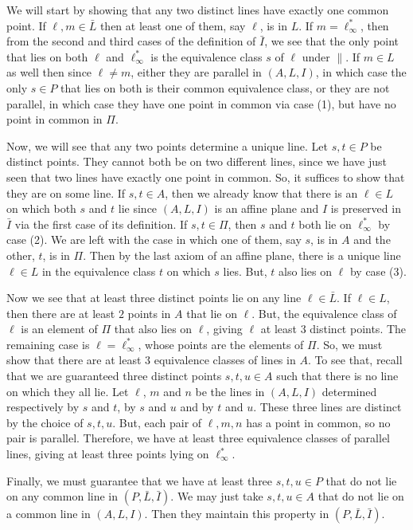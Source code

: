 \documentclass[../../main]{subfiles}
\begin{document}
We will start by showing that any two distinct lines have exactly one common
point. If $\ell,m\in\bar L$ then at least one of them, say $\ell$, is in $L$. If
$m=\ell^*_\infty$, then from the second and third cases of the definition of
$\bar I$, we see that the only point that lies on both $\ell$ and
$\ell^*_\infty$ is the equivalence class $s$ of $\ell$ under $\parallel$. If
$m\in L$ as well then since $\ell\ne m$, either they are parallel in $(A,L,I)$,
in which case the only $s\in P$ that lies on both is their common equivalence
class, or they are not parallel, in which case they have one point in common via
case (1), but have no point in common in $\Pi$.

Now, we will see that any two points determine a unique line. Let $s,t\in P$ be
distinct points. They cannot both be on two different lines, since we have just
seen that two lines have exactly one point in common. So, it suffices to show
that they are on some line. If $s,t\in A$, then we already  know that there is
an $\ell\in L$ on which both $s$ and $t$ lie since $(A,L,I)$ is an affine plane
and $I$ is preserved in $\bar{I}$ via the first case of its definition. If
$s,t\in\Pi$, then $s$ and $t$ both lie on $\ell^*_\infty$ by case (2). We are
left with the case in which one of them, say $s$, is in $A$ and the other, $t$,
is in $\Pi$. Then by the last axiom of an affine plane, there is a unique line
$\ell\in L$ in the equivalence class $t$ on which $s$ lies. But, $t$ also lies
on $\ell$ by case (3).

Now we see that at least three distinct points lie on any line $\ell\in\bar L$.
If $\ell\in L$, then there are at least $2$ points in $A$ that lie on $\ell$.
But, the equivalence class of $\ell$ is an element of $\Pi$ that also lies on
$\ell$, giving $\ell$ at least $3$ distinct points. The remaining case is
$\ell=\ell^*_\infty$, whose points are the elements of $\Pi$. So, we must show
that there are at least $3$ equivalence classes of lines in $A$. To see that,
recall that we are guaranteed three distinct points $s,t,u\in A$ such that there
is no line on which they all lie. Let $\ell$, $m$ and $n$ be the lines in
$(A,L,I)$ determined respectively by $s$ and $t$, by $s$ and $u$ and by $t$ and
$u$. These three lines are distinct by the choice of $s,t,u$. But, each pair of
$\ell,m,n$ has a point in common, so no pair is parallel. Therefore, we have at
least three equivalence classes of parallel lines, giving at least three points
lying on $\ell^*_\infty$.

Finally, we must guarantee that we have at least three $s,t,u\in P$ that do not
lie on any common line in $(P,\bar L,\bar I)$. We may just take $s,t,u\in A$
that do not lie on a common line in $(A,L,I)$.  Then they maintain this property
in $(P,\bar L,\bar I)$.
\end{document}

